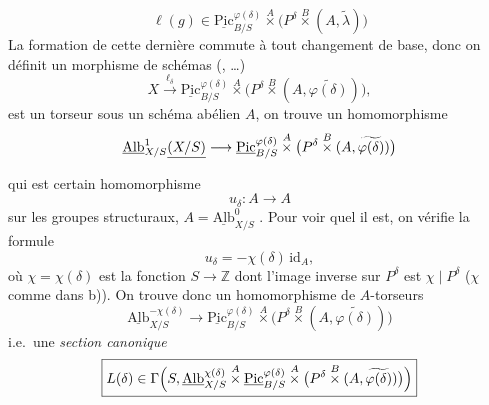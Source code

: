 \documentclass[11pt,a4paper]{article}
\begin{document}
\[
\ell(g) \in \underline{\mathrm{Pic}}^{\varphi(\delta)}_{B/S} \overset{A}{\times}
\bigl(P^{\delta} \overset{B}{\times} (A, \tilde{\lambda})\bigr)
\]
La formation de cette dernière commute à tout changement de base, donc on
définit un morphisme de schémas (, \ill{} \ldots)
\[
X \xrightarrow{\ \ell_{\delta}\ } \underline{\mathrm{Pic}}^{\varphi(\delta)}_{B/S}
\overset{A}{\times} \bigl(P^{\delta} \overset{B}{\times} (A, \widetilde{\varphi(\delta)})\bigr) ,
\]
 \ill{} est un torseur sous un schéma abélien $A$, on trouve
 un homomorphisme
\[
\underline{\mathrm{Alb}}^{1}_{X/S} \struck{(X/S)} \longrightarrow
\underline{\mathrm{Pic}}^{\varphi(\delta)}_{B/S} \overset{A}{\times}
\bigl(P^{\delta} \overset{B}{\times} (A, \widetilde{\varphi(\delta)})\bigr)
\]
qui est   certain homomorphisme
\[
u_{\delta} : A \longrightarrow A
\]
sur les groupes structuraux,
$A = \underline{\mathrm{Alb}}^{0}_{X/S}$ \struck{\ill{}}. Pour voir quel il est,
on vérifie la formule
\[
u_{\delta} = -\chi(\delta)\, \mathrm{id}_A ,
\]
où $\chi = \chi(\delta)$ est  la fonction $S \to \mathbb{Z}$
dont l'image inverse sur $P^{\delta}$ est $\chi \mid P^{\delta}$ ($\chi$ comme
dans b)). On trouve donc un  homomorphisme de $A$-torseurs
\[
\underline{\mathrm{Alb}}^{-\chi(\delta)}_{X/S} \longrightarrow
\underline{\mathrm{Pic}}^{\varphi(\delta)}_{B/S} \overset{A}{\times}
\bigl(P^{\delta} \overset{B}{\times} (A, \widetilde{\varphi(\delta)})\bigr)
\]
i.e.\ une \emph{section canonique}
\[
\boxed{L(\delta) \in \Gamma\Bigl(S, \underline{\mathrm{Alb}}^{\chi(\delta)}_{X/S}
\overset{A}{\times} \underline{\mathrm{Pic}}^{\varphi(\delta)}_{B/S}
\overset{A}{\times} \bigl(P^{\delta} \overset{B}{\times} (A, \widetilde{\varphi(\delta)})\bigr)\Bigr)}
\]
\end{document}
